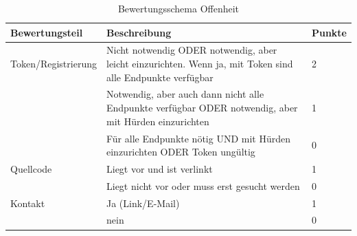 \documentclass[notitlepage, hidelinks]{article}
\begin{document}
\begin{table}[H]
\begin{center}
\begin{tabular}{|p{3.6cm}|p{8.5cm}|p{2.5cm}|}
\hline
\textbf{Bewertungsteil} & \textbf{Beschreibung} & \textbf{Punkte}\\ \hline
Token/Registrierung & Nicht notwendig ODER notwendig, aber leicht einzurichten. Wenn ja, mit Token sind alle Endpunkte verfügbar & 2\\ \hline
& Notwendig, aber auch dann nicht alle Endpunkte verfügbar ODER notwendig, aber mit Hürden einzurichten & 1\\ \hline
& Für alle Endpunkte nötig UND mit Hürden einzurichten ODER Token ungültig & 0\\ \hline
Quellcode & Liegt vor und ist verlinkt & 1\\ \hline
& Liegt nicht vor oder muss erst gesucht werden & 0\\ \hline
Kontakt & Ja (Link/E-Mail) & 1 \\ \hline
& nein & 0 \\ \hline
\end{tabular}
\caption{Bewertungsschema Offenheit}
\label{Offenheit}
\end{center}
\end{table}
\end{document}
